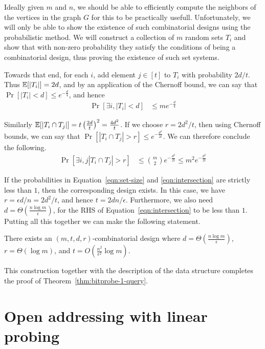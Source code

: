 Ideally given $m$ and $n$, we should be able to efficiently compute the
neighbors of the vertices in the graph $G$ for this to be practically
usefull. Unfortunately, we will only be able to show the existence of such
combinatorial designs using the probabilistic method. We will construct a
collection of $m$ random sets $T_i$ and show that with non-zero probability they
satisfy the conditions of being a combinatorial design, thus proving the
existence of such set systems.

Towards that end, for each $i$, add element $j\in [t]$ to $T_i$ with probability
$2d/t$. Thus $\mathbb{E}[|T_i|] = 2d$, and by an application of the Chernoff bound, we
can say that $\Pr\left[|T_i| < d \right] \leq e^{-\frac{d}{4}}$, and hence
\begin{align}
  \Pr\left[ \exists i, |T_i| < d \right] &\leq m e^{-\frac{d}{4}}
  \label{eqn:set-size}                                         
\end{align}

Similarly $\mathbb{E}[|T_i \cap T_j|] = t\left(\frac{2d}{t}\right)^2 =
\frac{4d^2}{t}$. If we choose $r = 2d^2/t$, then using Chernoff bounds, we can
say that $\Pr[|T_i \cap T_j| > r] \leq e^{-\frac{d^2}{2t}}$. We can therefore
conclude the following.
\begin{align}
  \Pr[ \exists i,j |T_i \cap T_j| > r] &\leq \binom{m}{2} e^{-\frac{d^2}{2t}} \leq m^2 e^{-\frac{d^2}{2t}}
  \label{eqn:intersection}
\end{align}

If the probabilities in Equation~\ref{eqn:set-size} and \ref{eqn:intersection}
are strictly less than $1$, then the corresponding design exists. In this case,
we have $r = \epsilon d/n = 2d^2 /t$, and hence $t = 2dn/\epsilon$. Furthermore,
we also need $d = \Theta\left(\frac{n\log m}{\epsilon} \right)$, for the RHS of
Equation~\ref{eqn:intersection} to be less than $1$. Putting all this together
we can make the following statement.
\begin{lemma}
  There exists an $(m,t,d,r)$-combinatorial design where
  $d = \Theta\left(\frac{n\log m}{\epsilon} \right)$, $r = \Theta(\log m)$, and
  $t = O\left(\frac{n^2}{\epsilon^2} \log m \right)$.
\end{lemma}

This construction together with the description of the data structure completes
the proof of Theorem~\ref{thm:bitprobe-1-query}.

\section{Open addressing with linear probing}


